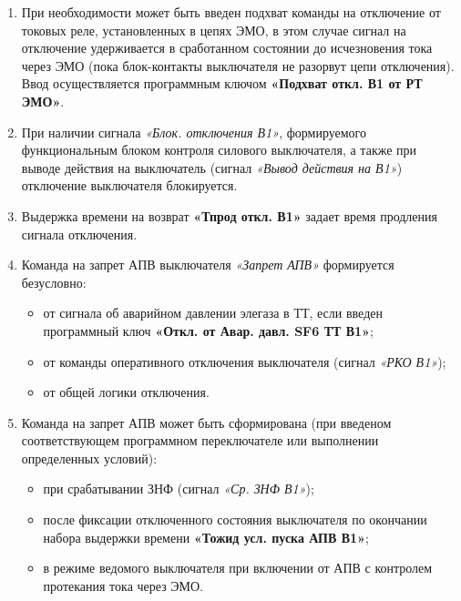 \begin{enumerate}[label=\arabic{section}.\arabic{subsection}.\arabic{enumi}, labelsep=4pt, leftmargin=0pt, itemindent=57pt, itemsep=0pt, parsep=0pt]
\item
При необходимости может быть введен подхват команды на отключение от токовых реле, установленных в цепях ЭМО, в этом случае сигнал на отключение удерживается в сработанном состоянии до исчезновения тока через ЭМО (пока блок-контакты выключателя не разорвут цепи отключения). Ввод осуществляется программным ключом \textbf{«Подхват откл. В1 от РТ ЭМО»}.

\item
При наличии сигнала \textit{«Блок. отключения В1»}, формируемого функциональным блоком контроля силового выключателя, а также при выводе действия на выключатель (сигнал \textit{«Вывод действия на В1»}) отключение выключателя блокируется.

\item
Выдержка времени на возврат \textbf{«Тпрод откл. В1»} задает время продления сигнала отключения. 

\item
Команда на запрет АПВ выключателя \textit{«Запрет АПВ»} формируется безусловно:
\begin{itemize}
    \item от сигнала об аварийном давлении элегаза в ТТ, если введен программный ключ \textbf{«Откл. от Авар. давл. SF6 ТТ В1»};
    \item от команды оперативного отключения выключателя (сигнал \textit{«РКО В1»});
    \item от общей логики отключения.
\end{itemize}

\item
Команда на запрет АПВ может быть сформирована (при введеном соответствующем программном переключателе или выполнении определенных условий):
\begin{itemize}
    \item при срабатывании ЗНФ (сигнал \textit{«Ср. ЗНФ В1»});
    \item после фиксации отключенного состояния выключателя по окончании набора выдержки времени \textbf{«Тожид усл. пуска АПВ В1»};
    \item в режиме ведомого выключателя при включении от АПВ с контролем протекания тока через ЭМО.
\end{itemize}


\end{enumerate}